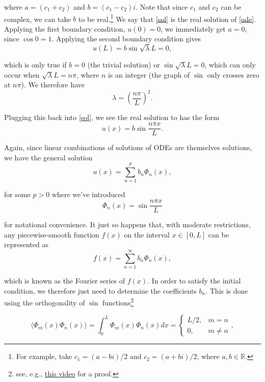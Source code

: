 \documentclass[11pt]{article}
\numberwithin{equation}{section}
\begin{document}
where $a = (c_1 + c_2)$ and $b = (c_1 - c_2)i$. Note that since $c_1$ and $c_2$ can be complex, we can take $b$ to be real.\footnote{For example, take $c_1 = (a - bi)/2$ and $c_2 = (a + bi)/2$, where $a, b \in \mathbb{R}$.} We say that \eqref{sol} is the real solution of \eqref{ode}. Applying the first boundary condition, $u(0) = 0$, we immediately get $a = 0$, since $\cos 0 = 1$. Applying the second boundary condition gives
\begin{equation*}
u(L) = b \sin \sqrt{\lambda} L = 0,
\end{equation*}

which is only true if $b = 0$ (the trivial solution) or $\sin \sqrt{\lambda} L = 0$, which can only occur when $\sqrt{\lambda} L = n \pi$, where $n$ is an integer (the graph of $\sin$ only crosses zero at $n \pi$). We therefore have 
\begin{equation*}
\lambda = \left( \frac{n \pi}{L} \right)^2.
\end{equation*}

Plugging this back into \eqref{sol}, we see the real solution to \label{ODE} has the form 
\begin{equation*}
u(x) = b \sin \frac{n \pi x}{L}.
\end{equation*}

Again, since linear combinations of solutions of ODEs are themselves solutions, we have the general solution
\begin{equation}
u(x) = \sum_{n = 1}^p b_n \Phi_n(x),
\end{equation}

for some $p > 0$ where we've introduced
\begin{equation*}
\Phi_n(x) = \sin \frac{n \pi x}{L}
\end{equation*}

for notational convenience. It just so happens that, with moderate restrictions, any piecewise-smooth function $f(x)$ on the interval $x \in[0, L]$ can be represented as 
\begin{equation}
f(x) = \sum_{n = 1}^{\infty} b_n \Phi_n(x), \label{fourier}
\end{equation}

which is known as the Fourier series of $f(x)$. In order to satisfy the initial condition, we therefore just need to determine the coefficients $b_n$. This is done using the orthogonality of $\sin$ functions\footnote{see, e.g., \href{https://www.youtube.com/watch?v=87sM1B9rRjE}{this video} for a proof.}


\begin{equation}
\langle \Phi_m(x) \Phi_n(x) \rangle = \int_0^L \Phi_m(x) \Phi_n(x) dx = 
  \begin{cases}
    L/2, & m = n \\
    0, & m \neq n
  \end{cases}, \label{ip}
\end{equation}
\end{document}
